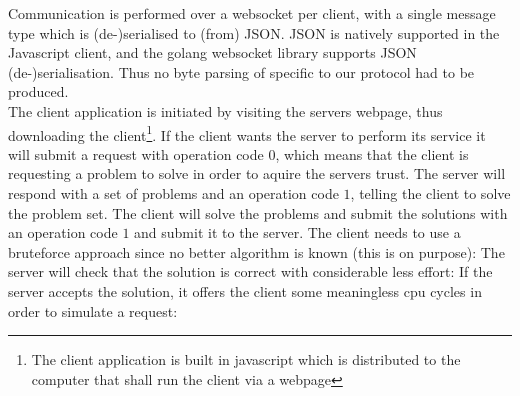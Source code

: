 Communication is performed over a websocket per client, with a single message type which is (de-)serialised to (from) JSON. JSON is natively supported in the Javascript client, and the golang websocket library supports JSON (de-)serialisation. Thus no byte parsing of specific to our protocol had to be produced.
\\
The client application is initiated by visiting the servers webpage, thus downloading the client\footnote{The client application is built in javascript which is distributed to the computer that shall run the client via a webpage}. If the client wants the server to perform its service it will submit a request with operation code $0$, which means that the client is requesting a problem to solve in order to aquire the servers trust. The server will respond with a set of problems and an operation code $1$, telling the client to solve the problem set. The client will solve the problems and submit the solutions with an operation code $1$ and submit it to the server. The client needs to use a bruteforce approach since no better algorithm is known (this is on purpose):
The server will check that the solution is correct with considerable less effort:
If the server accepts the solution, it offers the client some meaningless cpu cycles in order to simulate a request:






